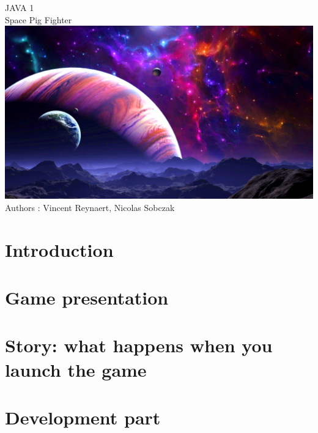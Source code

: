 \documentclass[twoside]{book}
\newcommand{\+}{\discretionary{\mbox{\scriptsize$\hookleftarrow$}}{}{}}
\newcommand{\clearemptydoublepage}{%
  \newpage{\pagestyle{empty}\cleardoublepage}%
}
\begin{document}
\hypersetup{pageanchor=false,
             bookmarksnumbered=true,
             pdfencoding=unicode
            }
\begin{titlepage}
\vspace*{3cm}
\begin{center}%
{\Huge JAVA 1}\\
\vspace*{3cm}
{\huge Space Pig Fighter  }\\ %
\vspace{4\baselineskip}
\includegraphics[width=450pt]{../../Images/space.jpg}\\
\vspace{11\baselineskip}
{\large Authors : Vincent Reynaert, Nicolas Sobczak}\\
\end{center}
\end{titlepage}
\clearemptydoublepage
\tableofcontents
\clearemptydoublepage
{}
\hypersetup{pageanchor=true}

\chapter{Introduction}

\chapter{Game presentation}

\chapter{Story: what happens when you launch the game}

\chapter{Development part}

\end{document}

